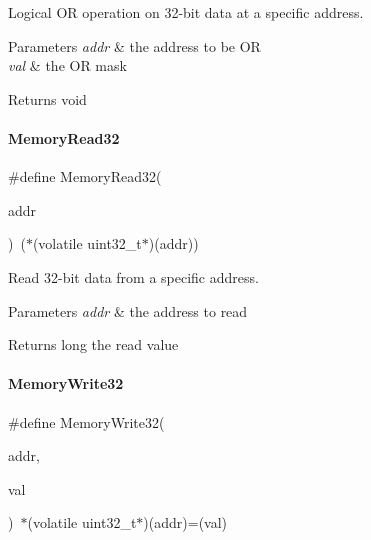 Logical OR operation on 32-\/bit data at a specific address. 


\begin{DoxyParams}{Parameters}
{\em addr} & the address to be OR \\
\hline
{\em val} & the OR mask \\
\hline
\end{DoxyParams}
\begin{DoxyReturn}{Returns}
void 
\end{DoxyReturn}
\mbox{\label{a00020_a2d484dc15bdf30ee11ab3b05f31f0e16}} 
\paragraph{\texorpdfstring{Memory\+Read32}{MemoryRead32}}
{\footnotesize\ttfamily \#define Memory\+Read32(\begin{DoxyParamCaption}\item[{}]{addr }\end{DoxyParamCaption})~($\ast$(volatile uint32\+\_\+t$\ast$)(addr))}



Read 32-\/bit data from a specific address. 


\begin{DoxyParams}{Parameters}
{\em addr} & the address to read \\
\hline
\end{DoxyParams}
\begin{DoxyReturn}{Returns}
long the read value 
\end{DoxyReturn}
\mbox{\label{a00020_a6b9732365b12e48ddb89fe1028b975b0}} 
\paragraph{\texorpdfstring{Memory\+Write32}{MemoryWrite32}}
{\footnotesize\ttfamily \#define Memory\+Write32(\begin{DoxyParamCaption}\item[{}]{addr,  }\item[{}]{val }\end{DoxyParamCaption})~$\ast$(volatile uint32\+\_\+t$\ast$)(addr)=(val)}



